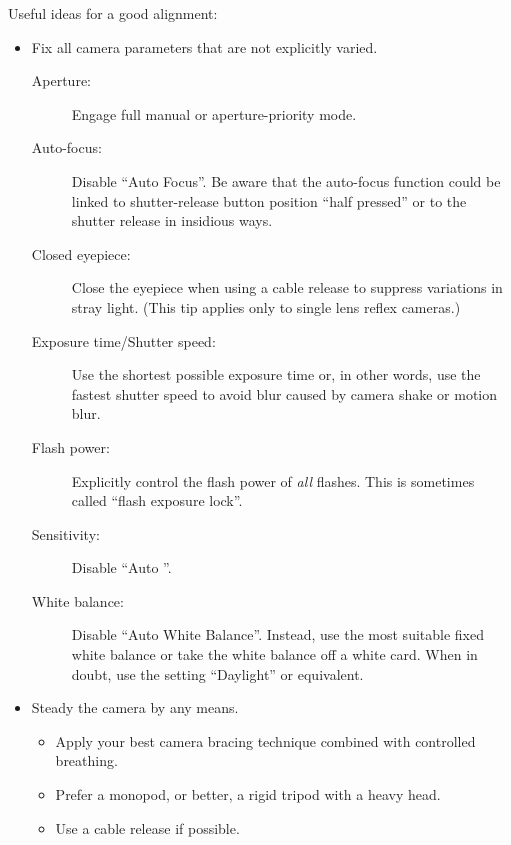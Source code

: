 \noindent Useful ideas for a good alignment:
\begin{itemize}
\item
  Fix all camera parameters that are not explicitly varied.

  \begin{description}
  \item[Aperture:] Engage full manual or aperture-priority mode.

  \item[Auto-focus:] Disable ``Auto Focus''.  Be aware that the auto-focus function could be
    linked to shutter-release button position ``half pressed'' or to the shutter release in
    insidious ways.

  \item[Closed eyepiece:] Close the eyepiece when using a cable release to suppress variations
    in stray light.  (This tip applies only to single lens reflex cameras.)

  \item[Exposure time/Shutter speed:] Use the shortest possible exposure time or, in other
    words, use the fastest shutter speed to avoid blur caused by camera shake or motion blur.

  \item[Flash power:] Explicitly control the flash power of \emph{all} flashes.  This is
    sometimes called ``flash exposure lock''.

  \item[Sensitivity:] Disable ``Auto ''.

  \item[White balance:] Disable ``Auto White Balance''.  Instead, use the most suitable fixed
    white balance or take the white balance off a white card.  When in doubt, use the setting
    ``Daylight'' or equivalent.
  \end{description}

\item
  Steady the camera by any means.

  \begin{itemize}
  \item
    Apply your best camera bracing technique combined with controlled breathing.

  \item
    Prefer a monopod, or better, a rigid tripod with a heavy head.

  \item
    Use a cable release if possible.


\end{itemize}
\end{itemize}
